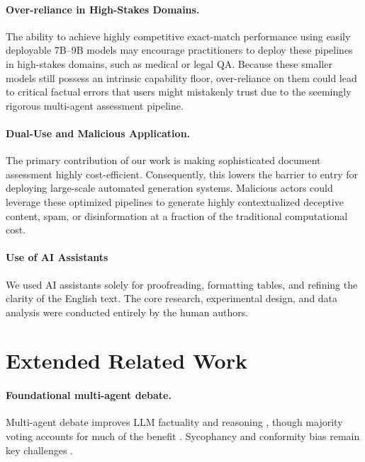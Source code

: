 \documentclass[11pt]{article}
\theoremstyle{definition}
\begin{document}
\paragraph{Over-reliance in High-Stakes Domains.} 
The ability to achieve highly competitive exact-match performance using easily deployable 7B--9B models may encourage practitioners to deploy these pipelines in high-stakes domains, such as medical or legal QA. Because these smaller models still possess an intrinsic capability floor, over-reliance on them could lead to critical factual errors that users might mistakenly trust due to the seemingly rigorous multi-agent assessment pipeline.

\paragraph{Dual-Use and Malicious Application.} 
The primary contribution of our work is making sophisticated document assessment highly cost-efficient. Consequently, this lowers the barrier to entry for deploying large-scale automated generation systems. Malicious actors could leverage these optimized pipelines to generate highly contextualized deceptive content, spam, or disinformation at a fraction of the traditional computational cost.

\paragraph{Use of AI Assistants}
We used AI assistants solely for proofreading, formatting tables, and refining the clarity of the English text. The core research, experimental design, and data analysis were conducted entirely by the human authors.





\appendix

\section{Extended Related Work}
\label{sec:appendix-related}

\paragraph{Foundational multi-agent debate.}
Multi-agent debate improves LLM factuality and reasoning \citep{du2024improving,liang2024encouraging}, though majority voting accounts for much of the benefit \citep{smit2023should}. Sycophancy and conformity bias remain key challenges \citep{cui2025free,jain2025beyond,pitre2025consensagent}.
\end{document}
